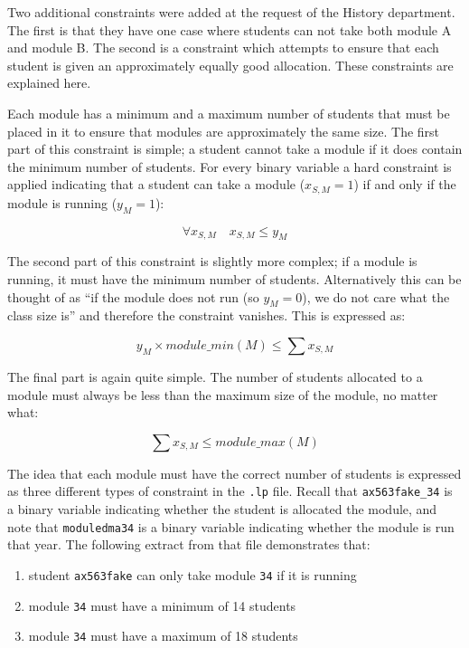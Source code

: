 Two additional constraints were added at the request of the History
department. The first is that they have one case where students can not take
both module A and module B. The second is a constraint which attempts to
ensure that each student is given an approximately equally good allocation.
These constraints are explained here.


Each module has a minimum and a maximum number of students that must be placed
in it to ensure that modules are approximately the same size. The first part
of this constraint is simple; a student cannot take a module if it does
contain the minimum number of students. For every \studmod binary variable a
hard constraint is applied indicating that a student can take a module
($x_{S,M}=1$) if and only if the module is running ($y_M=1$):

$$
\forall x_{S,M} \quad x_{S,M} \leq y_M
$$

The second part of this constraint is slightly more complex; if a module is
running, it must have the minimum number of students. Alternatively this can
be thought of as ``if the module does not run (so $y_M=0$), we do not care
what the class size is'' and therefore the constraint vanishes. This is
expressed as:

$$
y_M \times module\_min(M) \leq \displaystyle\sum x_{S,M}
$$

The final part is again quite simple. The number of students allocated to a
module must always be less than the maximum size of the module, no matter
what:

$$
\displaystyle\sum x_{S,M} \leq module\_max(M)
$$

The idea that each module must have the correct number of students is
expressed as three different types of constraint in the \texttt{.lp} file.
Recall that \texttt{ax563fake\_34} is a binary variable indicating whether the
student is allocated the module, and note that \texttt{moduledma34} is a
binary variable indicating whether the module is run that year. The following
extract from that file demonstrates that:

\begin{enumerate}
  \item student \texttt{ax563fake} can only take module \texttt{34} if it is running
  \item module \texttt{34} must have a minimum of 14 students
  \item module \texttt{34} must have a maximum of 18 students
\end{enumerate}

